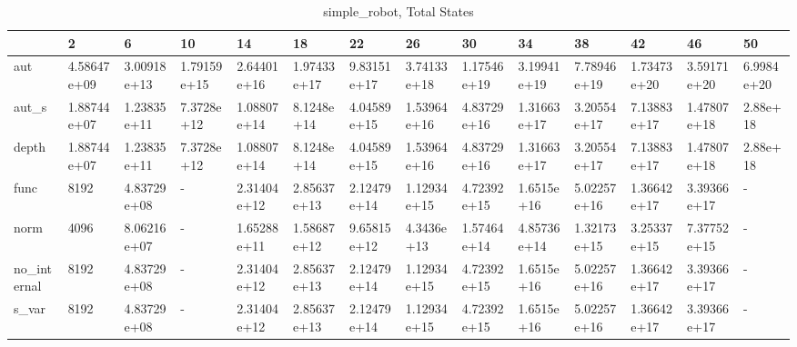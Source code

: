 \begin{table}
\caption{simple_robot, Total States}
\label{simple_robot_total}
\begin{tabular}{llllllllllllll}
\toprule
 & 2 & 6 & 10 & 14 & 18 & 22 & 26 & 30 & 34 & 38 & 42 & 46 & 50 \\
\midrule
aut & 4.58647e+09 & 3.00918e+13 & 1.79159e+15 & 2.64401e+16 & 1.97433e+17 & 9.83151e+17 & 3.74133e+18 & 1.17546e+19 & 3.19941e+19 & 7.78946e+19 & 1.73473e+20 & 3.59171e+20 & 6.9984e+20 \\
aut_s & 1.88744e+07 & 1.23835e+11 & 7.3728e+12 & 1.08807e+14 & 8.1248e+14 & 4.04589e+15 & 1.53964e+16 & 4.83729e+16 & 1.31663e+17 & 3.20554e+17 & 7.13883e+17 & 1.47807e+18 & 2.88e+18 \\
depth & 1.88744e+07 & 1.23835e+11 & 7.3728e+12 & 1.08807e+14 & 8.1248e+14 & 4.04589e+15 & 1.53964e+16 & 4.83729e+16 & 1.31663e+17 & 3.20554e+17 & 7.13883e+17 & 1.47807e+18 & 2.88e+18 \\
func & 8192 & 4.83729e+08 & - & 2.31404e+12 & 2.85637e+13 & 2.12479e+14 & 1.12934e+15 & 4.72392e+15 & 1.6515e+16 & 5.02257e+16 & 1.36642e+17 & 3.39366e+17 & - \\
norm & 4096 & 8.06216e+07 & - & 1.65288e+11 & 1.58687e+12 & 9.65815e+12 & 4.3436e+13 & 1.57464e+14 & 4.85736e+14 & 1.32173e+15 & 3.25337e+15 & 7.37752e+15 & - \\
no_internal & 8192 & 4.83729e+08 & - & 2.31404e+12 & 2.85637e+13 & 2.12479e+14 & 1.12934e+15 & 4.72392e+15 & 1.6515e+16 & 5.02257e+16 & 1.36642e+17 & 3.39366e+17 & - \\
s_var & 8192 & 4.83729e+08 & - & 2.31404e+12 & 2.85637e+13 & 2.12479e+14 & 1.12934e+15 & 4.72392e+15 & 1.6515e+16 & 5.02257e+16 & 1.36642e+17 & 3.39366e+17 & - \\
\bottomrule
\end{tabular}
\end{table}
